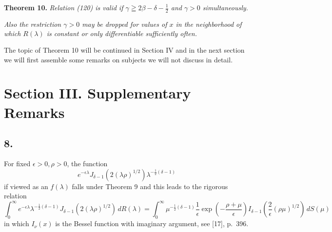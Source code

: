 \documentclass[12pt]{article}
\begin{document}
\medskip

\noindent\textbf{Theorem 10.} \emph{Relation (120) is valid if \(\gamma \geqq 2\beta - \delta - \tfrac{1}{2}\) and \(\gamma > 0\) simultaneously.}

\emph{Also the restriction \(\gamma > 0\) may be dropped for values of \(x\) in the neighborhood of which \(R(\lambda)\) is constant or only differentiable sufficiently often.}

The topic of Theorem 10 will be continued in Section IV and in the next section we will first assemble some remarks on subjects we will not discuss in detail.

\section*{Section III. Supplementary Remarks}

\subsection*{8.}

For fixed \(\epsilon > 0, \rho > 0\), the function
\begin{equation}
e^{-\epsilon\lambda} J_{\delta-1}(2(\lambda\rho)^{1/2}) \lambda^{-\frac{1}{2}(\delta-1)}
\tag{122}
\end{equation}
if viewed as an \(f(\lambda)\) falls under Theorem 9 and this leads to the rigorous relation
\begin{equation}
\int_0^{\infty} e^{-\epsilon\lambda} \lambda^{-\frac{1}{2}(\delta-1)} J_{\delta-1}(2(\lambda\rho)^{1/2}) \, dR(\lambda)
= \int_0^{\infty} \mu^{-\frac{1}{2}(\delta-1)} \frac{1}{\epsilon} \exp \left( -\frac{\rho + \mu}{\epsilon} \right) I_{\delta-1} \left( \frac{2}{\epsilon} (\rho\mu)^{1/2} \right) \, dS(\mu)
\tag{123}
\end{equation}
in which \(I_\nu(x)\) is the Bessel function with imaginary argument, see [17], p.~396.
\end{document}
